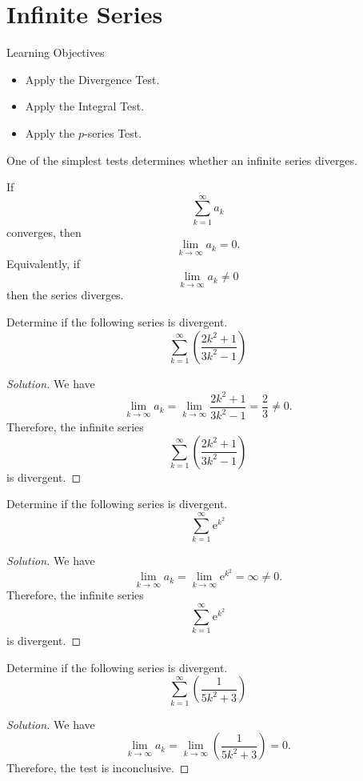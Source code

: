 \documentclass[compacto,10pt,comentarios]{aleph-notas}
\begin{document}
\encabezado

\section*{Infinite Series}
\begin{mdframed}
    \center Learning Objectives \\
    \begin{itemize}
        \item Apply the Divergence Test.
        \item Apply the Integral Test.
        \item Apply the $p$-series Test.
    \end{itemize}
\end{mdframed}

One of the simplest tests determines whether an infinite series diverges.
\begin{teo}
    If
    $$
        \sum_{k=1}^{\infty} a_k
    $$
    converges, then 
    $$
        \lim_{k \to \infty} a_k = 0.
    $$
    Equivalently, if
    $$
        \lim_{k \to \infty} a_k \neq 0
    $$
    then the series diverges.
\end{teo}

\begin{ejer}
    Determine if the following series is divergent.
    $$
        \sum_{k=1}^{\infty} \left( \frac{2k^2 + 1}{3k^2 - 1} \right)
    $$
\end{ejer}
\begin{proof}[Solution]
    We have
    $$
        \lim_{k \to \infty} a_k = \lim_{k \to \infty} \frac{2k^2+1}{3k^2-1} = \frac{2}{3} \neq 0.
    $$
    Therefore, the infinite series
    $$
        \sum_{k=1}^{\infty} \left( \frac{2k^2 + 1}{3k^2 - 1} \right)
    $$
    is divergent.
\end{proof}

\begin{ejer}
    Determine if the following series is divergent.
    $$
        \sum_{k=1}^{\infty} \mathrm{e}^{k^2}
    $$
\end{ejer}
\begin{proof}[Solution]
    We have
    $$
        \lim_{k \to \infty} a_k = \lim_{k \to \infty} \mathrm{e}^{k^2} = \infty \neq 0.
    $$
    Therefore, the infinite series
    $$
        \sum_{k=1}^{\infty} \mathrm{e}^{k^2}
    $$
    is divergent.
\end{proof}

\begin{ejer}
    Determine if the following series is divergent.
    $$
        \sum_{k=1}^{\infty} \left( \frac{1}{5k^2 + 3} \right)
    $$
\end{ejer}
\begin{proof}[Solution]
    We have
    $$
        \lim_{k \to \infty} a_k = \lim_{k \to \infty} \left( \frac{1}{5k^2 + 3} \right) = 0.
    $$
    Therefore, the test is inconclusive.
\end{proof}
\end{document}
